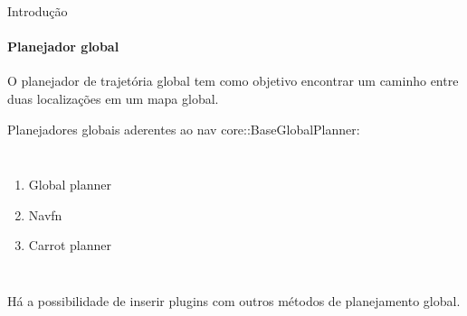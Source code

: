 \begin{frame}[t]{Introdução} 
    \framesubtitle{Planejador global}
    O planejador de trajetória global tem como objetivo encontrar um caminho entre duas localizações em um mapa global.

    Planejadores globais aderentes ao nav core::BaseGlobalPlanner:
        \begin{columns}[t]
                \begin{enumerate}
                    \item Global planner
                    \item Navfn
                    \item Carrot planner
                \end{enumerate}
            \begin{center}
                \begin{figure}
                \end{figure}
            \end{center}
        \end{columns}
        \vspace*{0.6cm}
        Há a possibilidade de inserir plugins com outros métodos de planejamento global.
\end{frame}
